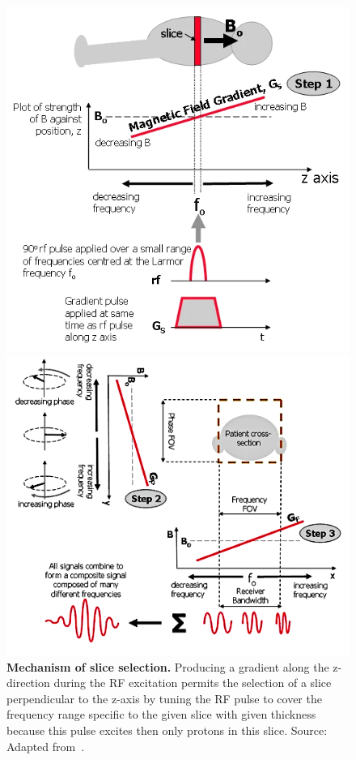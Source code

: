 \begin{figure}[thb]
    \centering
    \begin{minipage}{.43\textwidth}
        \centering
        \includegraphics[width=\linewidth]{images/slice_selection.png}
        \caption{\textbf{Mechanism of slice selection.} Producing a gradient along the z-direction during the RF excitation permits the selection of a slice perpendicular to the z-axis by tuning the RF pulse to cover the frequency range specific to the given slice with given thickness because this pulse excites then only protons in this slice. Source: Adapted from~\cite{ridgway_cardiovascular_2010}.}
        \label{fig:slice_selection}
    \end{minipage}%
    \hspace{0.03\textwidth}
    \begin{minipage}{0.53\textwidth}
        \centering
        \includegraphics[width=\linewidth]{images/phase_and_freq_encoding.png}

\end{minipage}
\end{figure}
